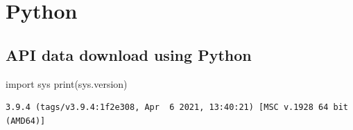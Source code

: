\documentclass[
  12pt,
]{article}
\newenvironment{Shaded}{\begin{snugshade}}{\end{snugshade}}
\newcommand{\BuiltInTok}[1]{#1}
\newcommand{\ImportTok}[1]{#1}
\newcommand{\NormalTok}[1]{#1}
\begin{document}
\hypertarget{python}{%
\section{Python}\label{python}}

\hypertarget{api-data-download-using-python}{%
\subsection{API data download using Python}\label{api-data-download-using-python}}

\begin{Shaded}
\begin{Highlighting}[]
\ImportTok{import}\NormalTok{ sys}
\BuiltInTok{print}\NormalTok{(sys.version)}
\end{Highlighting}
\end{Shaded}

\begin{verbatim}
3.9.4 (tags/v3.9.4:1f2e308, Apr  6 2021, 13:40:21) [MSC v.1928 64 bit (AMD64)]
\end{verbatim}
\end{document}
